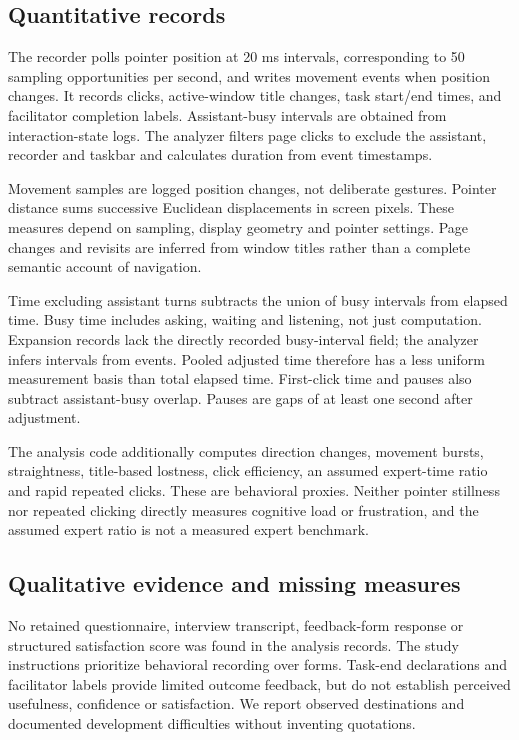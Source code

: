 \documentclass[11pt,a4paper]{article}
\begin{document}
\subsection{Quantitative records}
The recorder polls pointer position at 20 ms intervals, corresponding to 50 sampling opportunities per second, and writes movement events when position changes. It records clicks, active-window title changes, task start/end times, and facilitator completion labels. Assistant-busy intervals are obtained from interaction-state logs. The analyzer filters page clicks to exclude the assistant, recorder and taskbar and calculates duration from event timestamps.

Movement samples are logged position changes, not deliberate gestures. Pointer distance sums successive Euclidean displacements in screen pixels. These measures depend on sampling, display geometry and pointer settings. Page changes and revisits are inferred from window titles rather than a complete semantic account of navigation.

Time excluding assistant turns subtracts the union of busy intervals from elapsed time. Busy time includes asking, waiting and listening, not just computation. Expansion records lack the directly recorded busy-interval field; the analyzer infers intervals from events. Pooled adjusted time therefore has a less uniform measurement basis than total elapsed time. First-click time and pauses also subtract assistant-busy overlap. Pauses are gaps of at least one second after adjustment.

The analysis code additionally computes direction changes, movement bursts, straightness, title-based lostness, click efficiency, an assumed expert-time ratio and rapid repeated clicks. These are behavioral proxies. Neither pointer stillness nor repeated clicking directly measures cognitive load or frustration, and the assumed expert ratio is not a measured expert benchmark.

\subsection{Qualitative evidence and missing measures}
No retained questionnaire, interview transcript, feedback-form response or structured satisfaction score was found in the analysis records. The study instructions prioritize behavioral recording over forms. Task-end declarations and facilitator labels provide limited outcome feedback, but do not establish perceived usefulness, confidence or satisfaction. We report observed destinations and documented development difficulties without inventing quotations.
\end{document}
